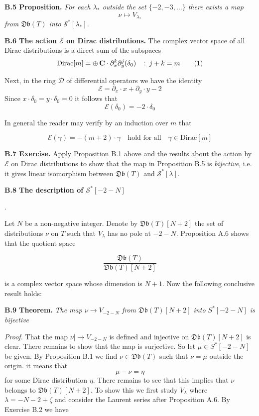 \medskip

\noindent
{\bf{B.5 Proposition.}}
\emph{For each $\lambda_*$ outside
the set $\{-2,-3,\ldots\}$ there exists a map}
\[
\nu\mapsto V_{\lambda_*}
\] 
\emph{from $\mathfrak{Db}(T)$ into $\mathcal S^*[\lambda_*]$.}
\bigskip





\noindent
{\bf{B.6 The action  $\mathcal E$
on
Dirac distributions.}}
The complex vector space of all Dirac distributions
is a direct sum of the subspaces
\[
\text{Dirac}[m]=
\oplus\,{\bf{C}}\cdot \partial_x^k\partial_y^j(\delta_0)
\quad\colon\, j+k=m\tag{1}
\]


\noindent
Next, in the ring
$\mathcal D$ of differential operators we
have the identity
\[ 
\mathcal E=\partial_x\cdot x+\partial_y\cdot y-2
\]
Since $x\cdot \delta_0=y\cdot \delta_0=0$ it follows that
\[ 
\mathcal E(\delta_0)=-2\cdot \delta_0
\]


\medskip

\noindent
In general the reader may verify by an induction over $m$ that

\[ 
\mathcal E(\gamma)= -(m+2)\cdot\gamma
\quad\text{hold for all}\quad \gamma\in\text{Dirac}[m]\tag{2}
\]
\medskip



\noindent
{\bf{B.7 Exercise.}}
Apply Proposition B.1 above and
the results about the action by
$\mathcal E$ on Dirac distributions to show
that the map in Proposition B.5  is \emph{bijective}, i.e. it gives
linear isomorphism between
$\mathfrak{Db}(T)$ and $\mathcal S^*[\lambda]$.

\newpage


\centerline {\bf{B.8 The description of $\mathcal S^*[-2-N]$}}.
\medskip

\noindent
Let $N$ be a non-negative integer. 
Denote by $\mathfrak{Db}(T)[N+2]$
the set of distributions
$\nu$  on
$T$ such that $V_\lambda$ has no pole at
$-2-N$.
Proposition A.6 shows that the quotient space

\[
\frac{\mathfrak{Db}(T)}{\mathfrak{Db}(T)[N+2]}
\]


\noindent
is a complex vector space whose dimension is
$N+1$.
Now the following conclusive result holds:

\bigskip

\noindent
{\bf{B.9 Theorem.}}
\emph{The map $\nu\to V_{-2-N}$
from
$\mathfrak{Db}(T)[N+2]$ 
into $S^*[-2-N]$ is bijective}

\bigskip

\noindent
\emph{Proof.}
That the map $\nu|\to V_{-2-N}$ is 
defined and injective on
$\mathfrak{Db}(T)[N+2]$ is  clear.
There remains to show that the map is surjective. So let
$\mu\in S^*[-2-N]$ be given.
By Proposition B.1 we find
$\nu\in \mathfrak{Db}(T)$ such that $\nu=\mu$ outside the origin. it means that
\[
\mu-\nu=\eta\tag{1}
\]
for some Dirac distribution $\eta$.
There remains  to see that this implies that
$\nu$ belongs to $\mathfrak{Db}(T)[N+2]$.
To show this we first study $V_\lambda$ where $\lambda=-N-2+\zeta$
and consider the Laurent series after Proposition A.6.
By Exercise B.2 we have


